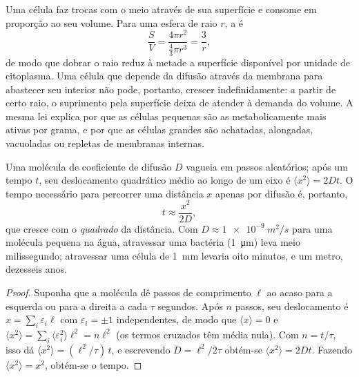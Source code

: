 \begin{proposition}\label{prop:b2:unicellular-diversity:surface}
Uma célula faz trocas com o meio através de sua superfície e consome
em proporção ao seu volume. Para uma esfera de raio $r$, a
\emph{} é
\[
\frac{S}{V} = \frac{4\pi r^2}{\tfrac{4}{3}\pi r^3} = \frac{3}{r},
\]
de modo que dobrar o raio reduz à metade a superfície disponível por
unidade de citoplasma. Uma célula que depende da difusão através da
membrana para abastecer seu interior não pode, portanto, crescer
indefinidamente: a partir de certo raio, o suprimento pela superfície
deixa de atender à demanda do volume. A mesma lei explica por que as
células pequenas são as metabolicamente mais ativas por grama, e por
que as células grandes são achatadas, alongadas, vacuoladas ou
repletas de membranas internas.
\end{proposition}

\begin{theorem}\label{thm:b2:unicellular-diversity:diffusion}
Uma molécula de coeficiente de difusão $D$ vagueia em passos
aleatórios; após um tempo $t$, seu deslocamento quadrático médio ao
longo de um eixo é $\langle x^2\rangle = 2Dt$. O tempo necessário para
percorrer uma distância $x$ apenas por difusão é, portanto,
\[
t \approx \frac{x^2}{2D},
\]
que cresce com o \emph{quadrado} da distância. Com
$D \approx \qty{1e-9}{m^2/s}$ para uma molécula pequena na água,
atravessar uma bactéria (\qty{1}{\micro m}) leva meio milissegundo;
atravessar uma célula de \qty{1}{mm} levaria oito minutos, e um metro,
dezesseis anos.
\end{theorem}
\begin{proof}
Suponha que a molécula dê passos de comprimento $\ell$ ao acaso para a
esquerda ou para a direita a cada $\tau$ segundos. Após $n$ passos, seu
deslocamento é $x = \sum_i \varepsilon_i \ell$ com
$\varepsilon_i = \pm 1$ independentes, de modo que
$\langle x\rangle = 0$ e $\langle x^2\rangle =
\sum_i \langle\varepsilon_i^2\rangle \ell^2 = n\ell^2$ (os termos
cruzados têm média nula). Com $n = t/\tau$, isso dá $\langle x^2\rangle
= (\ell^2/\tau)\,t$, e escrevendo $D = \ell^2/2\tau$ obtém-se
$\langle x^2\rangle = 2Dt$. Fazendo $\langle x^2\rangle = x^2$, obtém-se
o tempo.
\end{proof}

